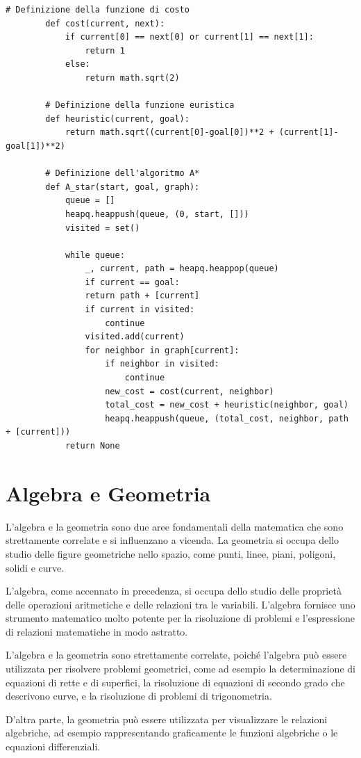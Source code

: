 \begin{minipage}{\textwidth}
	\begin{lstlisting}[caption={Algoritmo A*}]
		# Definizione della funzione di costo
		def cost(current, next):
			if current[0] == next[0] or current[1] == next[1]:
				return 1
			else:
				return math.sqrt(2)
		
		# Definizione della funzione euristica
		def heuristic(current, goal):
			return math.sqrt((current[0]-goal[0])**2 + (current[1]-goal[1])**2)
		
		# Definizione dell'algoritmo A*
		def A_star(start, goal, graph):
			queue = []
			heapq.heappush(queue, (0, start, []))
			visited = set()
			
			while queue:
				_, current, path = heapq.heappop(queue)
				if current == goal:
				return path + [current]
				if current in visited:
					continue
				visited.add(current)
				for neighbor in graph[current]:
					if neighbor in visited:
						continue
					new_cost = cost(current, neighbor)
					total_cost = new_cost + heuristic(neighbor, goal)
					heapq.heappush(queue, (total_cost, neighbor, path + [current]))
			return None
	\end{lstlisting}
\end{minipage}

\section{Algebra e Geometria}\label{sec:algebra}
L'algebra e la geometria sono due aree fondamentali della matematica che sono strettamente correlate e si influenzano a vicenda. La geometria si occupa dello studio delle figure geometriche nello spazio, come punti, linee, piani, poligoni, solidi e curve. 

L'algebra, come accennato in precedenza, si occupa dello studio delle proprietà delle operazioni aritmetiche e delle relazioni tra le variabili. L'algebra fornisce uno strumento matematico molto potente per la risoluzione di problemi e l'espressione di relazioni matematiche in modo astratto.

L'algebra e la geometria sono strettamente correlate, poiché l'algebra può essere utilizzata per risolvere problemi geometrici, come ad esempio la determinazione di equazioni di rette e di superfici, la risoluzione di equazioni di secondo grado che descrivono curve, e la risoluzione di problemi di trigonometria.

D'altra parte, la geometria può essere utilizzata per visualizzare le relazioni algebriche, ad esempio rappresentando graficamente le funzioni algebriche o le equazioni differenziali.


